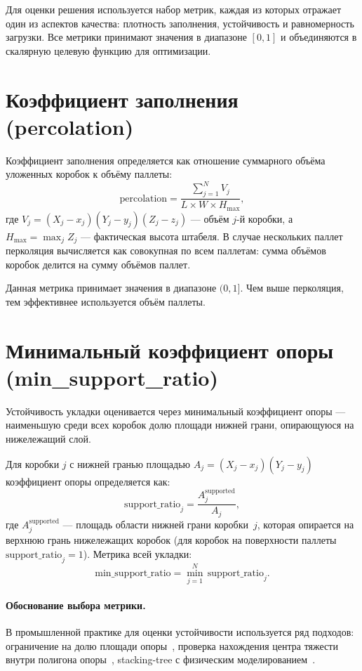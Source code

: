 Для оценки решения используется набор метрик, каждая из которых отражает один из аспектов качества: плотность заполнения, устойчивость и равномерность загрузки. Все метрики принимают значения в диапазоне $[0, 1]$ и объединяются в скалярную целевую функцию для оптимизации.

\section{Коэффициент заполнения (percolation)}
\label{sec:metric_perc}

Коэффициент заполнения определяется как отношение суммарного объёма уложенных коробок к объёму паллеты:
\[
\text{percolation} = \frac{\sum_{j=1}^{N} V_j}{L \times W \times H_{\max}},
\]
где $V_j = (X_j - x_j)(Y_j - y_j)(Z_j - z_j)$ --- объём $j$-й коробки, а $H_{\max} = \max_j Z_j$ --- фактическая высота штабеля. В случае нескольких паллет перколяция вычисляется как совокупная по всем паллетам: сумма объёмов коробок делится на сумму объёмов паллет.

Данная метрика принимает значения в диапазоне $(0, 1]$. Чем выше перколяция, тем эффективнее используется объём паллеты.

\section{Минимальный коэффициент опоры (min\_support\_ratio)}
\label{sec:metric_support}

Устойчивость укладки оценивается через минимальный коэффициент опоры --- наименьшую среди всех коробок долю площади нижней грани, опирающуюся на нижележащий слой.

Для коробки $j$ с нижней гранью площадью $A_j = (X_j - x_j)(Y_j - y_j)$ коэффициент опоры определяется как:
\[
\text{support\_ratio}_j = \frac{A_j^{\text{supported}}}{A_j},
\]
где $A_j^{\text{supported}}$ --- площадь области нижней грани коробки~$j$, которая опирается на верхнюю грань нижележащих коробок (для коробок на поверхности паллеты $\text{support\_ratio}_j = 1$). Метрика всей укладки:
\[
\text{min\_support\_ratio} = \min_{j=1}^{N}\, \text{support\_ratio}_j.
\]

\paragraph{Обоснование выбора метрики.}
В промышленной практике для оценки устойчивости используется ряд подходов: ограничение на долю площади опоры~\cite{Bischoff1995}, проверка нахождения центра тяжести внутри полигона опоры~\cite{Calzavara2021}, stacking-tree с физическим моделированием~\cite{Zhao2021}. 

